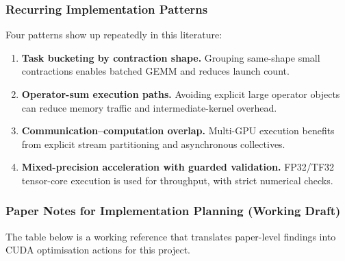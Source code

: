 \subsubsection{Recurring Implementation Patterns}

Four patterns show up repeatedly in this literature:

\begin{enumerate}
  \item \textbf{Task bucketing by contraction shape.} Grouping same-shape small
    contractions enables batched GEMM and reduces launch count.
  \item \textbf{Operator-sum execution paths.} Avoiding explicit large operator
    objects can reduce memory traffic and intermediate-kernel overhead.
  \item \textbf{Communication--computation overlap.} Multi-GPU execution
    benefits from explicit stream partitioning and asynchronous collectives.
  \item \textbf{Mixed-precision acceleration with guarded validation.} FP32/TF32
    tensor-core execution is used for throughput, with strict numerical checks.
\end{enumerate}

\subsubsection{Paper Notes for Implementation Planning (Working Draft)}
\label{sec:paper-notes-working-draft}

The table below is a working reference that translates paper-level findings
into CUDA optimisation actions for this project.

